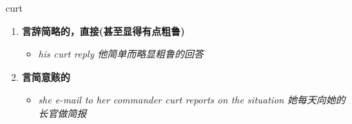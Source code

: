 
\begin{frame}
{\huge curt}
\begin{center}
\begin{enumerate}\Large
  \item \textbf{言辞简略的，直接(甚至显得有点粗鲁)}
  \begin{itemize}
    \item \em{\Large{his curt reply 他简单而略显粗鲁的回答}}
  \end{itemize}
  \item \textbf{言简意赅的}
  \begin{itemize}
    \item \em{\Large{she e-mail to her commander curt reports on the situation 她每天向她的长官做简报}}
  \end{itemize}
\end{enumerate}
\end{center}
\end{frame}
